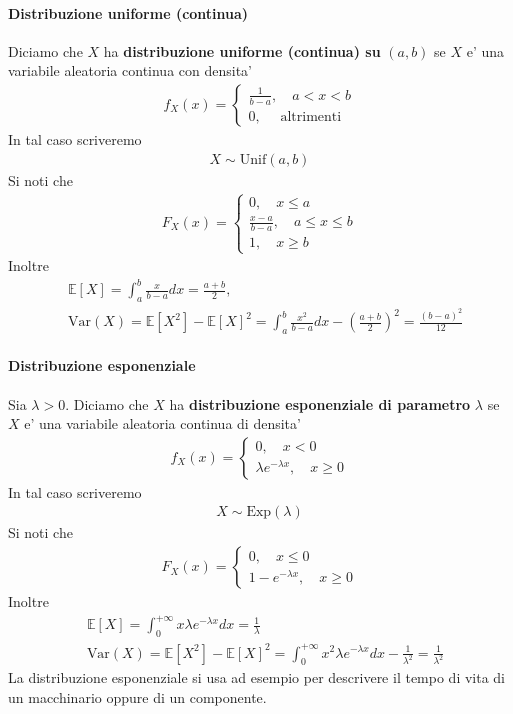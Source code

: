 \documentclass[a4paper,12pt]{article}
\begin{document}
\paragraph{Distribuzione uniforme (continua)} Diciamo che $X$ ha \textbf{distribuzione uniforme (continua) su} $(a,b)$ se $X$ e' una variabile aleatoria continua con densita'
\begin{align*}
  f_X(x) = \begin{cases}
    \frac{1}{b-a}, \quad a < x < b\\
    0, \quad \text{ altrimenti}
  \end{cases}
\end{align*}
In tal caso scriveremo
\begin{align*}
  X \sim \text{Unif}(a,b)
\end{align*}
Si noti che 
\begin{align*}
  F_X(x) = \begin{cases}
    0, \quad x \leq a\\
    \frac{x-a}{b-a}, \quad a \leq x \leq b\\
    1, \quad x \geq b
  \end{cases}
\end{align*}
Inoltre
\begin{align*}
  & \mathbb{E}[X] = \int_{a}^b \frac{x}{b-a} dx = \frac{a+b}{2},\\
  & \text{Var}(X) = \mathbb{E}[X^2]- \mathbb{E}[X]^2 = \int_a^b \frac{x^2}{b-a} dx - (\frac{a+b}{2})^2 = \frac{(b-a)^2}{12}
\end{align*}
\paragraph{Distribuzione esponenziale} Sia $\lambda > 0$. Diciamo che $X$ ha \textbf{distribuzione esponenziale di parametro} $\lambda$ se $X$ e' una variabile aleatoria continua di densita'
\begin{align*}
  f_X(x) = \begin{cases}
    0, \quad x < 0\\
    \lambda e^{-\lambda x}, \quad x\geq 0
  \end{cases}
\end{align*}
In tal caso scriveremo
\begin{align*}
  X \sim \text{Exp}(\lambda)
\end{align*}
Si noti che 
\begin{align*}
  F_X(x) = \begin{cases}
    0, \quad x \leq 0\\
    1-e^{-\lambda x}, \quad x \geq 0
  \end{cases}
\end{align*}
Inoltre
\begin{align*}
  & \mathbb{E}[X] = \int_0^{+\infty} x \lambda e^{-\lambda x} dx = \frac{1}{\lambda}\\
  & \text{Var}(X) = \mathbb{E}[X^2] - \mathbb{E}[X]^2 = \int_{0}^{+\infty} x^2 \lambda e^{-\lambda x} dx - \frac{1}{\lambda^2} = \frac{1}{\lambda^2}
\end{align*}
La distribuzione esponenziale si usa ad esempio per descrivere il tempo di vita di un macchinario oppure di un componente. 
\end{document}
